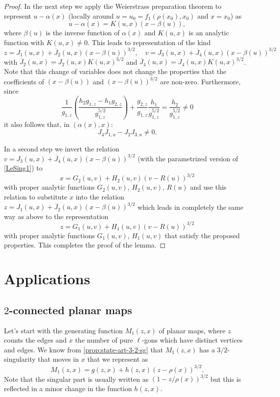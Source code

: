 \documentclass[a4paper,UKenglish,cleveref, autoref, thm-restate]{lipics-v2021}
\renewcommand{\(}{\left(}
\renewcommand{\)}{\right)}
\newcommand{\twoc}{\texorpdfstring{$2$}{2}-connected}
\newcommand{\ellgon}{pure \texorpdfstring{$\ell$}{ell}-gon}
\newcommand{\ellgons}{\ellgon s}
\begin{document}
\begin{proof}
    In the next step we apply the Weierstrass preparation theorem to 
    represent $u- \alpha(x)$  (locally around $u=u_0 = f_1(\rho(x_0),x_0)$ and $x = x_0$)  as 
    \[
    u- \alpha(x) = K(u,x)( x - \beta(u)),
    \]
    where $\beta(u)$ is the inverse function of $\alpha(x)$ and $K(u,x)$
    is an analytic function with $K(u,x)\ne 0$. This leads to representation
    of the kind
    \[
        z =  J_1(u,x) + \overline J_2(u,x) (x-\beta(u))^{3/2}, \quad
        v = J_3(u,x) + \overline J_4(u,x) (x- \beta(u))^{3/2}
    \]
    with $\overline J_2(u,x) = J_2(u,x) K(u,x)^{3/2}$ and
    $\overline J_4(u,x) = J_4(u,x) K(u,x)^{3/2}$. 
    Note that this change of variables does not change the properties 
    that the coefficients of $(x-\beta(u))$ and $(x-\beta(u))^{3/2}$ are non-zero.
    Furthermore, since 
    \[
    \frac{1}{g_{1,z}}\left( \frac{h_2g_{1,z}-h_1g_{2,z}}{g_{1,z}^{5/2}} \right)
    + \frac{g_{2,z}}{g_{1,z}} \frac{h_1}{g_{1,z}^{5/2}} = \frac{h_2}{g_{1,z}^{5/2}} \ne 0
    \]
    it also follows that, in $(\alpha(x),x)$:
    \[
    J_4 J_{1,u} - J_2 J_{3,u} \ne 0.
    \]

    In a second step we invert the relation 
    $v = J_3(u,x) + \overline J_4(u,x) (x- \beta(u))^{3/2}$ 
    (with the parametrized version of 
    \cref{LeSing1}) to
    \[
    x = G_2(u,v) + H_2(u,v) (v-R(u))^{3/2}
    \]
    with proper analytic functions $G_2(u,v)$, $H_2(u,v)$, $R(u)$ and 
    use this relation to substitute $x$ into the relation
    $z =  J_1(u,x) + \overline J_2(u,x) (x-\beta(u))^{3/2}$ which leads
    in completely the same way as above to the representation
    \[
    z = G_1(u,v) + H_1(u,v) (v-R(u))^{3/2}
    \]
    with proper analytic functions $G_1(u,v)$, $H_1(u,v)$ that satisfy
    the proposed properties. This completes the proof of the lemma.
\end{proof}

\section{Applications}
\label{sec:applications}
\subsection{\twoc{} planar maps}

Let's start with the generating function ${M_1}(z,x)$ of planar maps, where
$z$ counts the edges and $x$ the number of \ellgons{} which have distinct vertices and edges. We know from \cref{prop:state-art-3-2-sg} that ${M_1}(z,x)$ has a $3/2$-singularity that moves in $x$ that we represent as 
\[
{M_1}(z,x) = g(z,x) + h(z,x) (z-\rho(x))^{3/2}.
\]
Note that the singular part is usually written as 
$(1- z/\rho(x))^{3/2}$ but this is reflected in a minor change in 
the function $h(z,x)$.
\end{document}
